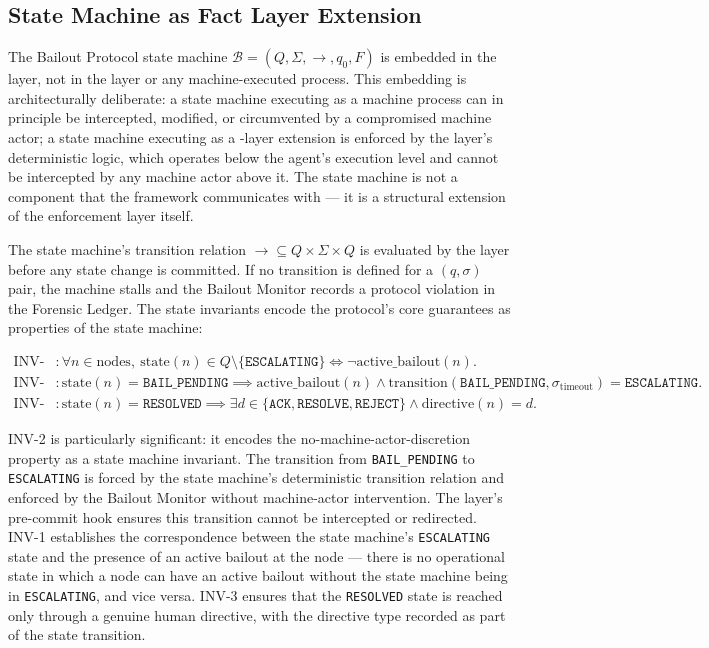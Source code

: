 \subsection{State Machine as Fact Layer Extension}
\label{sec:bailout-state-machine}

The Bailout Protocol state machine
$\mathcal{B} = (Q, \Sigma, \rightarrow, q_0, F)$ is embedded in the
\fact{} layer, not in the \bounds{} layer or any machine-executed process.
This embedding is architecturally deliberate: a state machine executing as a
machine process can in principle be intercepted, modified, or circumvented by
a compromised machine actor; a state machine executing as a \fact{}-layer
extension is enforced by the layer's deterministic logic, which operates
below the agent's execution level and cannot be intercepted by any machine
actor above it.  The state machine is not a component that the framework
communicates with --- it is a structural extension of the enforcement layer
itself.

The state machine's transition relation $\rightarrow \subseteq Q \times \Sigma \times Q$
is evaluated by the \fact{} layer before any state change is committed.  If
no transition is defined for a $(q, \sigma)$ pair, the machine stalls and the
Bailout Monitor records a protocol violation in the Forensic Ledger.  The
state invariants encode the protocol's core guarantees as properties of the
state machine:

\begin{align}
\text{INV-1}&: \forall n \in \text{nodes},\ \text{state}(n) \in Q \setminus \{\texttt{ESCALATING}\} \iff \neg\text{active\_bailout}(n). \tag{BP-INV-1} \\[6pt]
\text{INV-2}&: \text{state}(n) = \texttt{BAIL\_PENDING} \implies \text{active\_bailout}(n) \land \text{transition}(\texttt{BAIL\_PENDING}, \sigma_{\text{timeout}}) = \texttt{ESCALATING}. \tag{BP-INV-2} \\[6pt]
\text{INV-3}&: \text{state}(n) = \texttt{RESOLVED} \implies \exists d \in \{\texttt{ACK}, \texttt{RESOLVE}, \texttt{REJECT}\} \land \text{directive}(n) = d. \tag{BP-INV-3}
\end{align}

INV-2 is particularly significant: it encodes the no-machine-actor-discretion
property as a state machine invariant.  The transition from
\texttt{BAIL\_PENDING} to \texttt{ESCALATING} is forced by the state
machine's deterministic transition relation and enforced by the Bailout
Monitor without machine-actor intervention.  The \fact{} layer's pre-commit
hook ensures this transition cannot be intercepted or redirected.  INV-1
establishes the correspondence between the state machine's
\texttt{ESCALATING} state and the presence of an active bailout at the node
--- there is no operational state in which a node can have an active bailout
without the state machine being in \texttt{ESCALATING}, and vice versa.
INV-3 ensures that the \texttt{RESOLVED} state is reached only through a
genuine human directive, with the directive type recorded as part of the
state transition.

